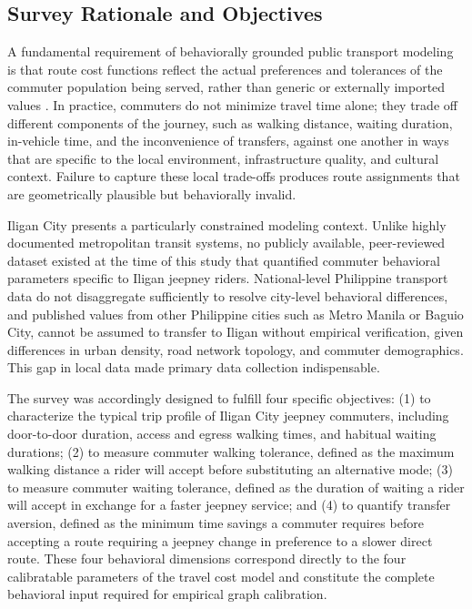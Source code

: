 \subsection{Survey Rationale and Objectives}
\label{subsec:3.1.1 survey rationale and objectives}
A fundamental requirement of behaviorally grounded public transport modeling is that route cost functions reflect the actual preferences and tolerances of the commuter population being served, rather than generic or externally imported values \citep{ortuzar2011modelling}. In practice, commuters do not minimize travel time alone; they trade off different components of the journey, such as walking distance, waiting duration, in-vehicle time, and the inconvenience of transfers, against one another in ways that are specific to the local environment, infrastructure quality, and cultural context. Failure to capture these local trade-offs produces route assignments that are geometrically plausible but behaviorally invalid.

Iligan City presents a particularly constrained modeling context. Unlike highly documented metropolitan transit systems, no publicly available, peer-reviewed dataset existed at the time of this study that quantified commuter behavioral parameters specific to Iligan jeepney riders. National-level Philippine transport data do not disaggregate sufficiently to resolve city-level behavioral differences, and published values from other Philippine cities such as Metro Manila or Baguio City, cannot be assumed to transfer to Iligan without empirical verification, given differences in urban density, road network topology, and commuter demographics. This gap in local data made primary data collection indispensable.

The survey was accordingly designed to fulfill four specific objectives: (1) to characterize the typical trip profile of Iligan City jeepney commuters, including door-to-door duration, access and egress walking times, and habitual waiting durations; (2) to measure commuter walking tolerance, defined as the maximum walking distance a rider will accept before substituting an alternative mode; (3) to measure commuter waiting tolerance, defined as the duration of waiting a rider will accept in exchange for a faster jeepney service; and (4) to quantify transfer aversion, defined as the minimum time savings a commuter requires before accepting a route requiring a jeepney change in preference to a slower direct route. These four behavioral dimensions correspond directly to the four calibratable parameters of the travel cost model and constitute the complete behavioral input required for empirical graph calibration.


